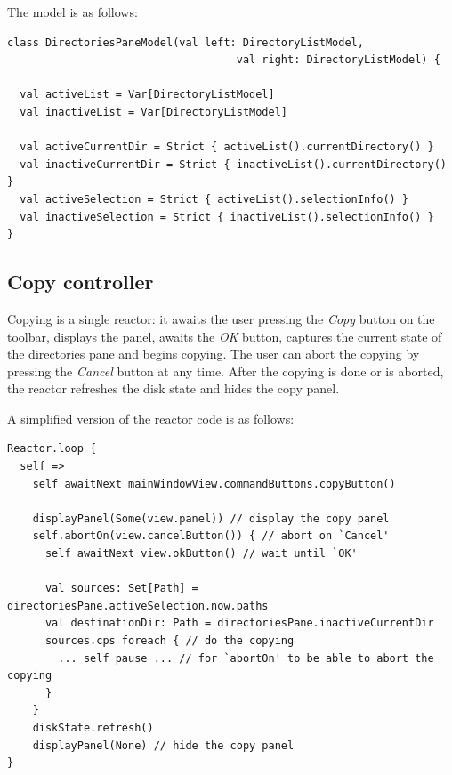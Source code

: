 The model is as follows:


\begin{lstlisting}
class DirectoriesPaneModel(val left: DirectoryListModel,
                                    val right: DirectoryListModel) {

  val activeList = Var[DirectoryListModel]
  val inactiveList = Var[DirectoryListModel]

  val activeCurrentDir = Strict { activeList().currentDirectory() }
  val inactiveCurrentDir = Strict { inactiveList().currentDirectory() }
  val activeSelection = Strict { activeList().selectionInfo() }
  val inactiveSelection = Strict { inactiveList().selectionInfo() }
}
\end{lstlisting}



\subsection{Copy controller}

Copying is a single reactor: it awaits the user pressing the \emph{Copy} button on the toolbar, displays the panel, awaits the \emph{OK} button, captures the current state of the directories pane and begins copying. The user can abort the copying by pressing the \emph{Cancel} button at any time. After the copying is done or is aborted, the reactor refreshes the disk state and hides the copy panel.

A simplified version of the reactor code is as follows:

\begin{lstlisting}
Reactor.loop {
  self =>      
    self awaitNext mainWindowView.commandButtons.copyButton()
    
    displayPanel(Some(view.panel)) // display the copy panel
    self.abortOn(view.cancelButton()) { // abort on `Cancel'
      self awaitNext view.okButton() // wait until `OK'

      val sources: Set[Path] = directoriesPane.activeSelection.now.paths
      val destinationDir: Path = directoriesPane.inactiveCurrentDir
      sources.cps foreach { // do the copying
        ... self pause ... // for `abortOn' to be able to abort the copying
      }
    }
    diskState.refresh()
    displayPanel(None) // hide the copy panel
}
\end{lstlisting}


